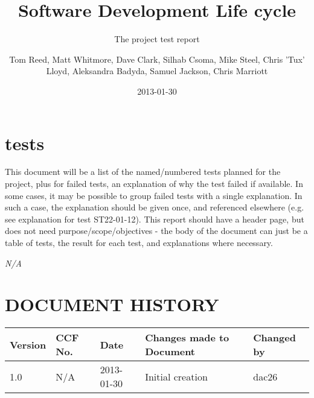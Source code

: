 \documentclass{project}
\begin{document}
\title{Software Development Life cycle}
\subtitle{The project test report}
\author{Tom Reed, Matt Whitmore, Dave Clark, Silhab Csoma, Mike Steel, Chris 'Tux' Lloyd, Aleksandra Badyda, Samuel Jackson, Chris Marriott}
\date{2013-01-30}
\maketitle
\tableofcontents
\newpage
\section{tests}
This document will be a list of the named/numbered tests planned for the project, plus for failed tests, an
explanation of why the test failed if available. In some cases, it may be possible to group failed tests with a
single explanation. In such a case, the explanation should be given once, and referenced elsewhere (e.g. see
explanation for test ST22-01-12).
This report should have a header page, but does not need purpose/scope/objectives - the body of the document
can just be a table of tests, the result for each test, and explanations where necessary.
\clearpage
{}
\begin{thebibliography}{5}
\bibitem{} \emph{N/A}
\end{thebibliography}
\clearpage
{}
\section*{DOCUMENT HISTORY}
\begin{tabular}{|l | l | l | l | l |}
\hline
Version & CCF No. & Date & Changes made to Document & Changed by \\
\hline
1.0 & N/A & 2013-01-30 & Initial creation & dac26 \\
\hline
\end{tabular}
\label{thelastpage}
\end{document}

